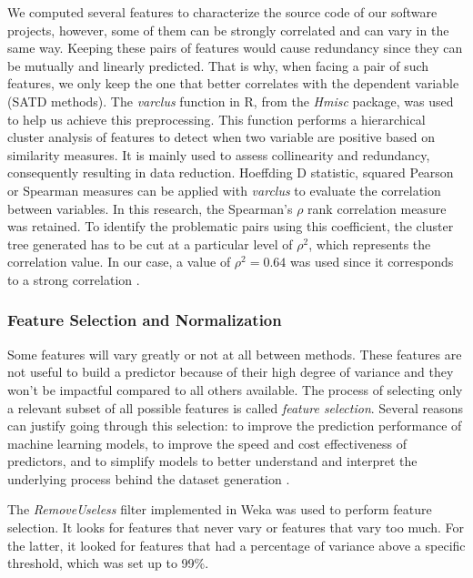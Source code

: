 We computed several features to characterize the source code of our software projects, however, some of them can be strongly correlated and can vary in the same way. Keeping these pairs of features would cause redundancy since they can be mutually and linearly predicted. That is why, when facing a pair of such features, we only keep the one that better correlates with the dependent variable (\ac{SATD} methods). The \emph{varclus} function in R, from the \emph{Hmisc} package, was used to help us achieve this preprocessing. This function performs a hierarchical cluster analysis of features to detect when two variable are positive based on similarity measures. It is mainly used to assess collinearity and redundancy, consequently resulting in data reduction. Hoeffding D statistic, squared Pearson or Spearman measures can be applied with \emph{varclus} to evaluate the correlation between variables. In this research, the Spearman's $\rho$ rank correlation measure was retained. To identify the problematic pairs using this coefficient, the cluster tree generated has to be cut at a particular level of $\rho^2$, which represents the correlation value. In our case, a value of $\rho^2=0.64$ was used since it corresponds to a strong correlation \citep{Cohen-1988}.

\subsubsection{Feature Selection and Normalization}

Some features will vary greatly or not at all between methods. These features are not useful to build a predictor because of their high degree of variance and they won't be impactful compared to all others available. The process of selecting only a relevant subset of all possible features is called \emph{feature selection}. Several reasons can justify going through this selection: to improve the prediction performance of machine learning models, to improve the speed and cost effectiveness of predictors, and to simplify models to better understand and interpret the underlying process behind the dataset generation \citep{guyon2003introduction}. \par 

The \emph{RemoveUseless} filter implemented in Weka \citep{hall2009weka} was used to perform feature selection. It looks for features that never vary or features that vary too much. For the latter, it looked for features that had a percentage of variance above a specific threshold, which was set up to 99\%. \par 

